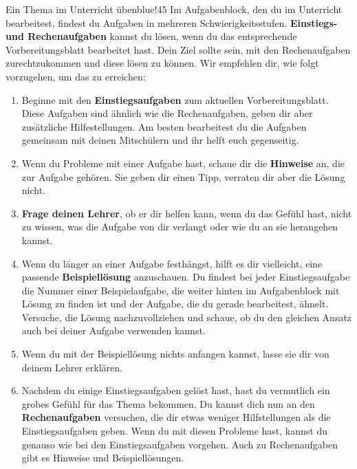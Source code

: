 \documentclass[../main.tex]{subfiles}
\begin{document}
\begin{goal}{Ein Thema im Unterricht üben}{blue!45}
    Im Aufgabenblock, den du im Unterricht bearbeitest, findest du Aufgaben in mehreren Schwierigkeitsstufen. \textbf{Einstiegs- und Rechenaufgaben} kannst du lösen, wenn du das entsprechende Vorbereitungsblatt bearbeitet hast. Dein Ziel sollte sein, mit den Rechenaufgaben zurechtzukommen und diese lösen zu können. Wir empfehlen dir, wie folgt vorzugehen, um das zu erreichen:
    \begin{enumerate}
        \item[\tikzball{blue!50!black}{1}] Beginne mit den \textbf{Einstiegsaufgaben} zum aktuellen Vorbereitungsblatt. Diese Aufgaben sind ähnlich wie die Rechenaufgaben, geben dir aber zusätzliche Hilfestellungen. Am besten bearbeitest du die Aufgaben gemeinsam mit deinen Mitschülern und ihr helft euch gegenseitig.
        \item[\tikzball{blue!50!black}{2}] Wenn du Probleme mit einer Aufgabe hast, schaue dir die \textbf{Hinweise} an, die zur Aufgabe gehören. Sie geben dir einen Tipp, verraten dir aber die Lösung nicht.
        \item[\tikzball{blue!50!black}{3}] \textbf{Frage deinen Lehrer}, ob er dir helfen kann, wenn du das Gefühl hast, nicht zu wissen, was die Aufgabe von dir verlangt oder wie du an sie herangehen kannst.
        \item[\tikzball{blue!50!black}{4}] Wenn du länger an einer Aufgabe festhängst, hilft es dir vielleicht, eine passende \textbf{Beispiellösung} anzuschauen. Du findest bei jeder Einstiegsaufgabe die Nummer einer Beispielaufgabe, die weiter hinten im Aufgabenblock mit Lösung zu finden ist und der Aufgabe, die du gerade bearbeitest, ähnelt. Versuche, die Lösung nachzuvollziehen und schaue, ob du den gleichen Ansatz auch bei deiner Aufgabe verwenden kannst.
        \item[\tikzball{blue!50!black}{5}] Wenn du mit der Beispiellösung nichts anfangen kannst, lasse sie dir von deinem Lehrer erklären.
        \item[\tikzball{blue!50!black}{6}] Nachdem du einige Einstiegsaufgaben gelöst hast, hast du vermutlich ein grobes Gefühl für das Thema bekommen. Du kannst dich nun an den \textbf{Rechenaufgaben} versuchen, die dir etwas weniger Hilfstellungen als die Einstiegsaufgaben geben. Wenn du mit diesen Probleme hast, kannst du genauso wie bei den Einstiegsaufgaben vorgehen. Auch zu Rechenaufgaben gibt es Hinweise und Beispiellösungen.
    \end{enumerate}
\end{goal}
\end{document}
